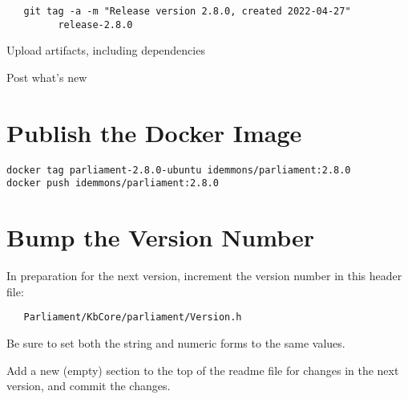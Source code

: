 \documentclass[12pt,letterpaper,draft]{article}
\begin{document}
\begin{verbatim}
   git tag -a -m "Release version 2.8.0, created 2022-04-27"
         release-2.8.0
\end{verbatim}

Upload artifacts, including dependencies

Post what's new



\section{Publish the Docker Image}

\begin{verbatim}
docker tag parliament-2.8.0-ubuntu idemmons/parliament:2.8.0
docker push idemmons/parliament:2.8.0
\end{verbatim}



\section{Bump the Version Number}

In preparation for the next version, increment the version number in this header file:
\begin{verbatim}
   Parliament/KbCore/parliament/Version.h
\end{verbatim}
Be sure to set both the string and numeric forms to the same values.

Add a new (empty) section to the top of the readme file for changes in the next version, and commit the changes.
\end{document}
